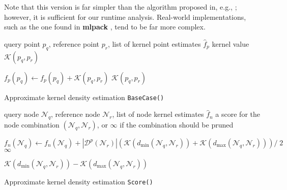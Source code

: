 Note that this version is far simpler than the algorithm proposed in,
e.g., \cite{gray2003nonparametric}; however, it is sufficient for our runtime
analysis.  Real-world implementations, such as the one found in \textbf{mlpack}
\cite{mlpack2013}, tend to be far more complex.

\begin{algorithm}[tb]
  \begin{algorithmic}[1]
     query point $p_q$, reference point $p_r$, list of
  kernel point estimates $\hat{f}_p$
     kernel value $\mathcal{K}(p_q, p_r)$

    \medskip
    \STATE $f_p(p_q) \gets f_p(p_q) + \mathcal{K}(p_q, p_r)$
    \RETURN $\mathcal{K}(p_q, p_r)$
  \end{algorithmic}

  \caption{Approximate kernel density estimation \texttt{BaseCase()}}
  \label{alg:kde_base_case}
\end{algorithm}

\begin{algorithm}[tb]
  \begin{algorithmic}[1]
     query node $\mathscr{N}_q$, reference node
$\mathscr{N}_r$, list of node kernel estimates $\hat{f}_n$
     a score for the node combination $(\mathscr{N}_q,
\mathscr{N}_r)$, or $\infty$ if the combination should be pruned

    \medskip

      \STATE $f_n(\mathscr{N}_q) \gets f_n(\mathscr{N}_q) + |
\mathscr{D}^p(\mathscr{N}_r) | \left(\mathcal{K}(d_{\min}(\mathscr{N}_q,
\mathscr{N}_r)) + \mathcal{K}(d_{\max}(\mathscr{N}_q, \mathscr{N}_r))\right) /\;2$
      \RETURN $\infty$
    \ENDIF

    \RETURN $\mathcal{K}(d_{\min}(\mathscr{N}_q, \mathscr{N}_r)) -
\mathcal{K}(d_{\max}(\mathscr{N}_q, \mathscr{N}_r))$
  \end{algorithmic}

  \caption{Approximate kernel density estimation \texttt{Score()}}
  \label{alg:kde_score}
\end{algorithm}

